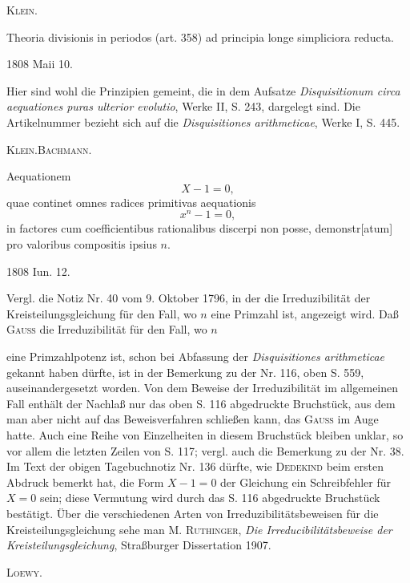 \par\noindent\hfill\textsc{Klein.}
\par\endgroup

\noindent\hspace*{\parindent}Theoria divisionis in periodos  (art. 358) ad principia longe simpliciora reducta.
\par\noindent\hfill 1808 Maii 10.
\par\medskip\begingroup\small
\noindent\hspace*{\parindent}Hier sind wohl die Prinzipien gemeint, die in dem Aufsatze \textit{Disquisitionum circa aequationes puras ulterior evolutio}, Werke II, S. 243, dargelegt sind. Die Artikelnummer bezieht sich auf die \textit{Disquisitiones arithmeticae}, Werke I, S. 445.
\par\noindent\hfill\textsc{Klein.\quad Bachmann.}
\par\endgroup

\noindent\hspace*{\parindent}Aequationem
\[
X-1=0,
\]
\noindent quae continet omnes radices primitivas aequationis
\[
x^n-1=0,
\]
\noindent in factores cum coefficientibus rationalibus discerpi non posse, demonstr[atum] pro valoribus compositis ipsius \(n\).
\par\noindent\hfill 1808 Iun. 12.
\par\medskip\begingroup\small
\noindent\hspace*{\parindent}Vergl. die Notiz Nr. 40 vom 9. Oktober 1796, in der die Irreduzibilität der Kreisteilungsgleichung für den Fall, wo \(n\) eine Primzahl ist, angezeigt wird. Daß \textsc{Gauss} die Irreduzibilität für den Fall, wo \(n\)
\par\endgroup
\clearpage{}
\par\begingroup\small
\noindent eine Primzahlpotenz ist, schon bei Abfassung der \textit{Disquisitiones arithmeticae} gekannt haben dürfte, ist in der Bemerkung zu der Nr. 116, oben S. 559, auseinandergesetzt worden. Von dem Beweise der Irreduzibilität im allgemeinen Fall enthält der Nachlaß nur das oben S. 116 abgedruckte Bruchstück, aus dem man aber nicht auf das Beweisverfahren schließen kann, das \textsc{Gauss} im Auge hatte. Auch eine Reihe von Einzelheiten in diesem Bruchstück bleiben unklar, so vor allem die letzten Zeilen von S. 117; vergl. auch die Bemerkung zu der Nr. 38. Im Text der obigen Tagebuchnotiz Nr. 136 dürfte, wie \textsc{Dedekind} beim ersten Abdruck bemerkt hat, die Form \(X-1=0\) der Gleichung ein Schreibfehler für \(X=0\) sein; diese Vermutung wird durch das S. 116 abgedruckte Bruchstück bestätigt. Über die verschiedenen Arten von Irreduzibilitätsbeweisen für die Kreisteilungsgleichung sehe man M. \textsc{Ruthinger}, \textit{Die Irreducibilitätsbeweise der Kreisteilungsgleichung}, Straßburger Dissertation 1907.
\par\noindent\hfill\textsc{Loewy.}
\par\endgroup

